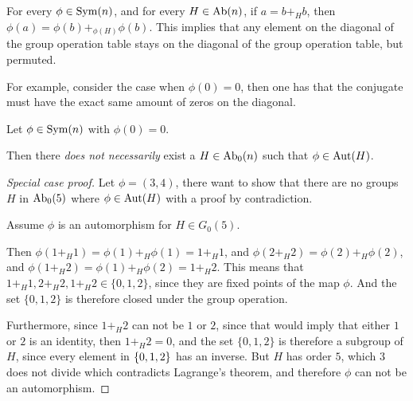 \begin{remark}
    For every \( \phi \in \operatorname{Sym}(n) \), and for every \( H \in \operatorname{Ab}(n) \), if \( a = b +_H b \), then \( \phi(a) = \phi(b) +_{\phi(H)} \phi(b) \). This implies that any element on the diagonal of the group operation table stays on the diagonal of the group operation table, but permuted.

    For example, consider the case when \( \phi(0) = 0 \), then one has that the conjugate must have the exact same amount of zeros on the diagonal.
\end{remark}

\begin{counterexample}
    Let \( \phi \in \operatorname{Sym}(n) \) with \( \phi(0) = 0 \).
    
    Then there \emph{does not necessarily} exist a \( H \in \operatorname{Ab}_0(n) \) such that \( \phi \in \operatorname{Aut}(H) \).
\end{counterexample}
\begin{proof}[Special case proof]
    Let \( \phi = (3, 4) \), there want to show that there are no groups \( H \) in \( \operatorname{Ab}_0(5) \) where \( \phi \in \operatorname{Aut}(H) \) with a proof by contradiction.

    Assume \( \phi \) is an automorphism for \( H \in G_0(5) \).

    Then \( \phi(1 +_H 1) = \phi(1) +_H \phi(1) = 1 +_H 1 \), and \( \phi(2 +_H 2) = \phi(2) +_H \phi(2) \), and \( \phi(1 +_H 2) = \phi(1) +_H \phi(2) = 1 +_H 2 \). This means that \( 1 +_H 1, 2 +_H 2, 1 +_H 2 \in \{0, 1, 2\} \), since they are fixed points of the map \( \phi \). And the set \( \{ 0, 1, 2 \} \) is therefore closed under the group operation.

    Furthermore, since \( 1 +_H 2 \) can not be \( 1 \) or \( 2 \), since that would imply that either \( 1 \) or \( 2 \) is an identity, then \( 1 +_H 2 = 0 \), and the set \( \{ 0, 1, 2 \} \) is therefore a subgroup of \( H \), since every element in \( \left\{ 0, 1, 2 \right\} \) has an inverse. But \( H \) has order \( 5 \), which \( 3 \) does not divide which contradicts Lagrange's theorem, and therefore \( \phi \) can not be an automorphism.
\end{proof}
